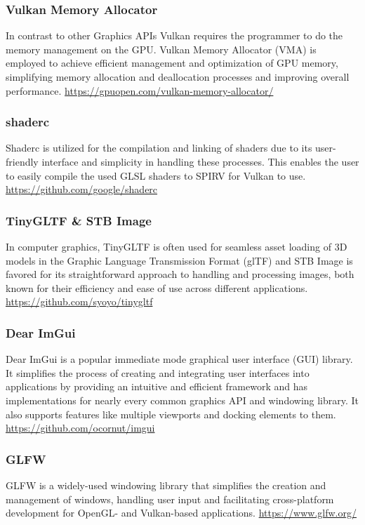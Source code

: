 \documentclass[intern]{cgMA}
\begin{document}
    \subsubsection*{Vulkan Memory Allocator}   
    In contrast to other Graphics APIs Vulkan requires the programmer to do the memory management on the GPU. Vulkan Memory Allocator (VMA) is employed to achieve efficient management and optimization of GPU memory, simplifying memory allocation and deallocation processes and improving overall performance. \url{https://gpuopen.com/vulkan-memory-allocator/}

    \subsubsection*{shaderc}   
    Shaderc is utilized for the compilation and linking of shaders due to its user-friendly interface and simplicity in handling these processes. This enables the user to easily compile the used GLSL shaders to SPIRV for Vulkan to use. \url{https://github.com/google/shaderc}

    \subsubsection*{TinyGLTF \& STB Image}  
    In computer graphics, TinyGLTF is often used for seamless asset loading of 3D models in the Graphic Language Transmission Format (glTF) and STB Image is favored for its straightforward approach to handling and processing images, both known for their efficiency and ease of use across different applications. \url{https://github.com/syoyo/tinygltf}

    \subsubsection*{Dear ImGui}
    Dear ImGui is a popular immediate mode graphical user interface (GUI) library. It simplifies the process of creating and integrating user interfaces into applications by providing an intuitive and efficient framework and has implementations for nearly every common graphics API and windowing library. It also supports features like multiple viewports and docking elements to them. \url{https://github.com/ocornut/imgui}

    \subsubsection*{GLFW}
    GLFW is a widely-used windowing library that simplifies the creation and management of windows, handling user input and facilitating cross-platform development for OpenGL- and Vulkan-based applications. \url{https://www.glfw.org/}
\end{document}
